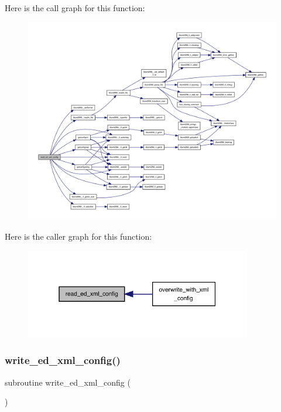 Here is the call graph for this function\+:
\nopagebreak
\begin{figure}[H]
\begin{center}
\leavevmode
\includegraphics[width=350pt]{ed__xml__config_8f90_accb60513f4c46e691fcd1f96c1e9df36_cgraph}
\end{center}
\end{figure}
Here is the caller graph for this function\+:
\nopagebreak
\begin{figure}[H]
\begin{center}
\leavevmode
\includegraphics[width=280pt]{ed__xml__config_8f90_accb60513f4c46e691fcd1f96c1e9df36_icgraph}
\end{center}
\end{figure}
\mbox{\label{ed__xml__config_8f90_adac334da78b1efa5c92f7caf53e2d855}} 
\subsubsection{\texorpdfstring{write\+\_\+ed\+\_\+xml\+\_\+config()}{write\_ed\_xml\_config()}}
{\footnotesize\ttfamily subroutine write\+\_\+ed\+\_\+xml\+\_\+config (\begin{DoxyParamCaption}{ }\end{DoxyParamCaption})}

